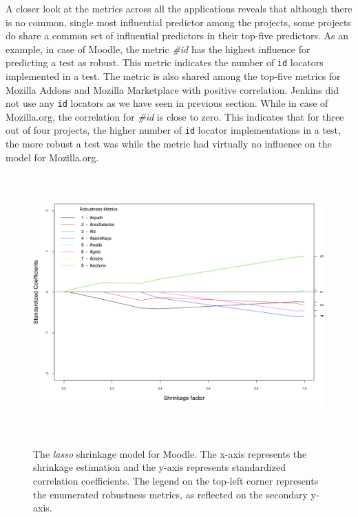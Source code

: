 A closer look at the metrics across all the applications reveals that although there is no common, single most influential predictor among the projects, some projects do share a common set of influential predictors in their top-five predictors. As an example, in case of Moodle, the metric \textit{\#id} has the highest influence for predicting a test as robust. This metric indicates the number of \texttt{id} locators implemented in a test. The metric is also shared among the top-five metrics for Mozilla Addons and Mozilla Marketplace with positive correlation. Jenkins did not use any \texttt{id} locators as we have seen in previous section. While in case of Mozilla.org, the correlation for \textit{\#id} is close to zero. This indicates that for three out of four projects, the higher number of \texttt{id} locator implementations in a test, the more robust a test was while the metric had virtually no influence on the model for Mozilla.org. 

\begin{figure}[ht!] 
\centering     %
{\label{fig:moodlelasso}\includegraphics[width=13cm,height=10cm]{./Figures/moodlelasso}}
  \captionsetup{justification=justified,
singlelinecheck=false}
\caption{The \textit{lasso} shrinkage model for Moodle. The x-axis represents the shrinkage estimation and the y-axis represents standardized correlation coefficients. The legend on the top-left corner represents the enumerated robustness metrics, as reflected on the secondary y-axis.}
\label{fig:lasso1}
\end{figure} 


